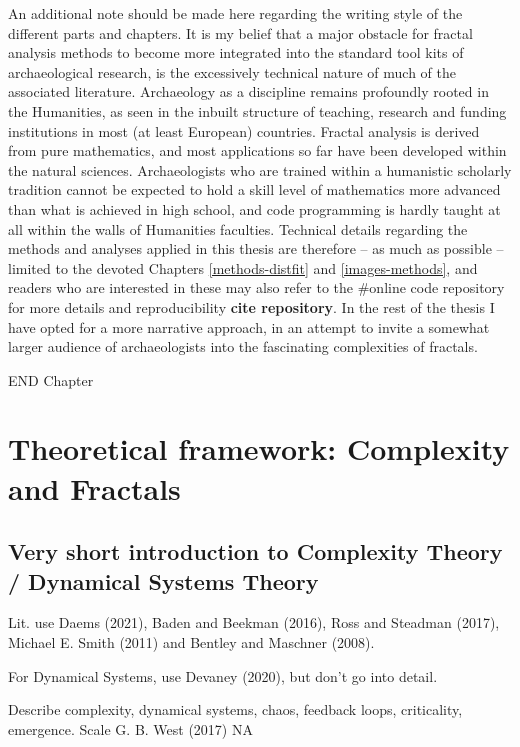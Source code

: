 \documentclass[
  12pt,
  a4paper, twoside]{book}
\begin{document}
An additional note should be made here regarding the writing style of the different parts and chapters. It is my belief that a major obstacle for fractal analysis methods to become more integrated into the standard tool kits of archaeological research, is the excessively technical nature of much of the associated literature. Archaeology as a discipline remains profoundly rooted in the Humanities, as seen in the inbuilt structure of teaching, research and funding institutions in most (at least European) countries. Fractal analysis is derived from pure mathematics, and most applications so far have been developed within the natural sciences. Archaeologists who are trained within a humanistic scholarly tradition cannot be expected to hold a skill level of mathematics more advanced than what is achieved in high school, and code programming is hardly taught at all within the walls of Humanities faculties. Technical details regarding the methods and analyses applied in this thesis are therefore -- as much as possible -- limited to the devoted Chapters \ref{methods-distfit} and \ref{images-methods}, and readers who are interested in these may also refer to the \#online code repository for more details and reproducibility \textbf{cite repository}. In the rest of the thesis I have opted for a more narrative approach, in an attempt to invite a somewhat larger audience of archaeologists into the fascinating complexities of fractals.

END Chapter

\hypertarget{theory}{%
\chapter{Theoretical framework: Complexity and Fractals}\label{theory}}

\hypertarget{very-short-introduction-to-complexity-theory-dynamical-systems-theory}{%
\section{Very short introduction to Complexity Theory / Dynamical Systems Theory}\label{very-short-introduction-to-complexity-theory-dynamical-systems-theory}}

Lit. use Daems (2021), Baden and Beekman (2016), Ross and Steadman (2017), Michael E. Smith (2011) and Bentley and Maschner (2008).

For Dynamical Systems, use Devaney (2020), but don't go into detail.

Describe complexity, dynamical systems, chaos, feedback loops, criticality, emergence. Scale G. B. West (2017) NA
\end{document}

